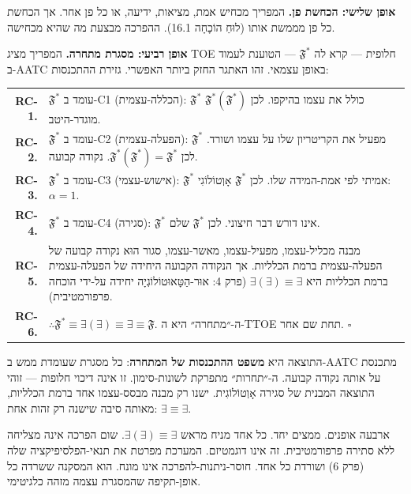 \documentclass[10pt, openany, oneside]{book}
\renewcommand{\footnotesize}{\fontsize{8.5}{11}\selectfont}
\begin{document}
\textbf{אופן שלישי: הכחשת פן.} המפריך מכחיש אמת, מציאות, ידיעה, או כל פן אחר. אך הכחשת כל פן מממשת אותו (לוּחַ הוֹכָחָה 16.1). ההפרכה מבצעת מה שהיא מכחישה.

\textbf{אופן רביעי: מסגרת מתחרה.} המפריך מציג TOE חלופית — קרא לה $\mathfrak{F}^*$ — הטוענת לעמוד ב-AATC באופן עצמאי. זהו האתגר החזק ביותר האפשרי. גזירת ההתכנסות:

\vspace{0.5em}

{\footnotesize
\noindent\begin{tabular}{r p{}}
\textbf{RC-1.} & $\mathfrak{F}^*$ עומד ב-C1 (הכללה-עצמית): $\mathfrak{F}^*$ כולל את עצמו בהיקפו. לכן $\mathfrak{F}^*(\mathfrak{F}^*)$ מוגדר-היטב. \\[0.3em]
\textbf{RC-2.} & $\mathfrak{F}^*$ עומד ב-C2 (הפעלה-עצמית): $\mathfrak{F}^*$ מפעיל את הקריטריון שלו על עצמו ושורד. לכן $\mathfrak{F}^*(\mathfrak{F}^*) = \mathfrak{F}^*$. נקודה קבועה. \\[0.3em]
\textbf{RC-3.} & $\mathfrak{F}^*$ עומד ב-C3 (אישוש-עצמי): $\mathfrak{F}^*$ אמיתי לפי אמת-המידה שלו. לכן $\mathfrak{F}^*$ אָוְטוֹלוֹגִי: $\alpha = 1$. \\[0.3em]
\textbf{RC-4.} & $\mathfrak{F}^*$ עומד ב-C4 (סגירה): $\mathfrak{F}^*$ אינו דורש דבר חיצוני. לכן $\mathfrak{F}^*$ שלם. \\[0.3em]
\textbf{RC-5.} & מבנה מכליל-עצמו, מפעיל-עצמו, מאשר-עצמו, סגור הוּא נקודה קבועה של הפעלה-עצמית ברמת הכלליות. אך הנקודה הקבועה היחידה של הפעלה-עצמית ברמת הכלליות היא $\exists(\exists) \equiv \exists$ (פרק 4: אוּר-הַטָּאוּטוֹלוֹגְיָה יחידה על-ידי הוכחה פרפורמטיבית). \\[0.3em]
\textbf{RC-6.} & $\therefore \mathfrak{F}^* \equiv \exists(\exists) \equiv \exists \equiv \mathfrak{F}$. ה-״מתחרה״ היא ה-TTOE תחת שם אחר. $\square$ \\[0.3em]
\end{tabular}
}

\vspace{0.5em}

\noindent התוצאה היא \textbf{משפט ההתכנסות של המתחרה}: כל מסגרת שעומדת ממש ב-AATC מתכנסת על אותה נקודה קבועה. ה-״תחרות״ מתפרקת לשונות-סימון. זו אינה דיכוי חלופות — זוהי התוצאה המבנית של סגירה אָוְטוֹלוֹגִית. ישנו רק מבנה מבסס-עצמו אחד ברמת הכלליות, מאותה סיבה שישנה רק זהות אחת: $\exists \equiv \exists$.

ארבעה אופנים. ממצים יחד. כל אחד מניח מראש $\exists(\exists) \equiv \exists$. שום הפרכה אינה מצליחה ללא סתירה פרפורמטיבית. זה אינו דוגמטיזם. המערכת מפרטת את תנאי-הפלסיפיקציה שלה (פרק 6) ושורדת כל אחד. חוסר-ניתנות-להפרכה אינו מונח. הוא המסקנה ששרדה כל אופן-תקיפה שהמסגרת עצמה מזהה כלגיטימי.
\end{document}
